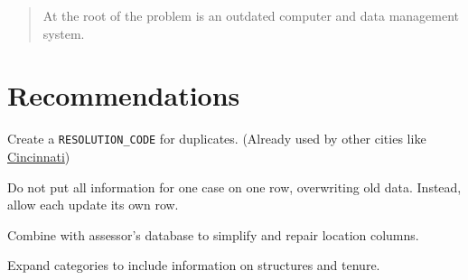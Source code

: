 \documentclass[
]{book}
\begin{document}
\begin{quote}
At the root of the problem is an outdated computer and data management system.
\end{quote}

\hypertarget{recommendations-1}{%
\section{Recommendations}\label{recommendations-1}}

Create a \texttt{RESOLUTION\_CODE} for duplicates. (Already used by other cities like \href{https://data.cincinnati-oh.gov/Thriving-Neighborhoods/Code-Enforcement/cncm-znd6}{Cincinnati})

Do not put all information for one case on one row, overwriting old data. Instead, allow each update its own row.

Combine with assessor's database to simplify and repair location columns.

Expand categories to include information on structures and tenure.

  
\end{document}
